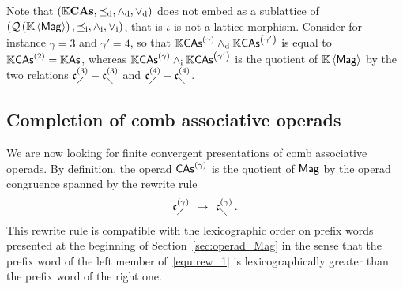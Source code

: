 Note that $\LatKCAs$ does not embed as a sublattice of $\LatQMag$, that
is $\iota$ is not a lattice morphism. Consider for instance $\gamma = 3$
and $\gamma' = 4$, so that $\KCAs{\gamma} \InfCAs \KCAs{\gamma'}$ is
equal to $\KCAs{2} = \K\As$, whereas
$\KCAs{\gamma} \InfQMag \KCAs{\gamma'}$ is the quotient of $\KMag$ by the
two relations $\LComb{3} - \RComb{3}$ and $\LComb{4} - \RComb{4}$.
\medbreak

\subsection{Completion of comb associative operads}
We are now looking for finite convergent presentations of comb
associative operads. By definition, the operad $\CAs{\gamma}$ is the
quotient of $\Mag$ by the operad congruence spanned by the rewrite rule
\begin{equation} \label{equ:rew_1}
    \LComb{\gamma}
    \enspace \Rew \enspace
    \RComb{\gamma}\,.
\end{equation}
This rewrite rule is compatible with the lexicographic order on prefix
words presented at the beginning of Section~\ref{sec:operad_Mag} in the
sense that the prefix word of the left member of~\eqref{equ:rew_1} is
lexicographically greater than the prefix word of the right one.
\medbreak

